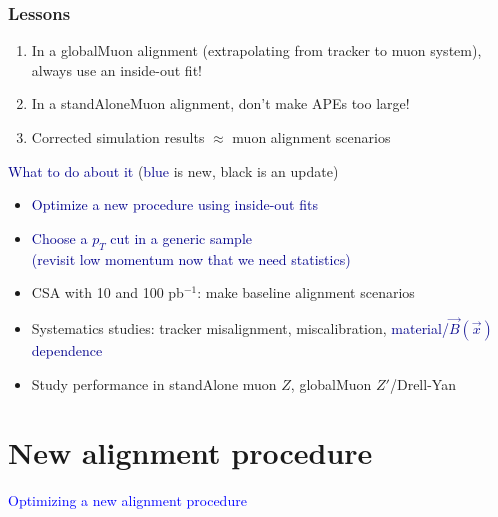 \documentclass[compress]{beamer}
\begin{document}
\begin{frame}
\frametitle{Lessons}

\vspace{-0.25 cm}
\begin{enumerate}
\item In a globalMuon alignment (extrapolating from tracker to muon system),
always use an inside-out fit!
\item In a standAloneMuon alignment, don't make APEs too large!
\item Corrected simulation results $\approx$ muon alignment scenarios
\end{enumerate}

\vfill
\hspace{-0.83 cm} \textcolor{darkblue}{\Large What to do about it} \hfill (\textcolor{darkblue}{blue} is new, black is an update)
\begin{itemize}
\item \textcolor{darkblue}{Optimize a new procedure using inside-out fits}
\item \textcolor{darkblue}{Choose a $p_T$ cut in a generic sample} \\ \textcolor{darkblue}{(revisit low momentum now that we need statistics)}
\item CSA with 10 and 100 pb$^{-1}$: make baseline alignment scenarios
\item Systematics studies: tracker misalignment, miscalibration,
\textcolor{darkblue}{material/$\vec{B}(\vec{x})$ dependence}
\item Study performance in standAlone muon $Z$, globalMuon $Z'$/Drell-Yan
\end{itemize}
\end{frame}

\section*{New alignment procedure}

\begin{frame}
\begin{center}
\Huge \textcolor{blue}{Optimizing a new alignment procedure}
\end{center}
\end{frame}
\end{document}
